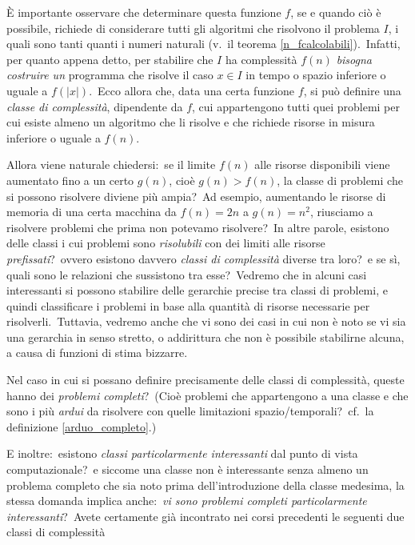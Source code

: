 È importante osservare che determinare questa funzione $f$, se e quando ciò è possibile, richiede di considerare tutti gli algoritmi che risolvono il problema $I$, i quali sono tanti quanti i numeri naturali (v.\ il teorema \ref{n_fcalcolabili}).\
Infatti, per quanto appena detto, per stabilire che $I$ ha complessità $f(n)$ \textit{bisogna costruire un} programma che risolve il caso $x \in I$ in tempo o spazio inferiore o uguale a $f(|x|)$.\
Ecco allora che, data una certa funzione $f$, si può definire una \textit{classe di complessità}, dipendente da $f$, cui appartengono tutti quei problemi per cui esiste almeno un algoritmo che li risolve e che richiede risorse in misura inferiore o uguale a $f(n)$.\

Allora viene naturale chiedersi:\ se il limite $f(n)$ alle risorse disponibili viene aumentato fino a un certo $g(n)$, cioè $g(n) > f (n)$, la classe di problemi che si possono risolvere diviene più ampia?\
Ad esempio, aumentando le risorse di memoria di una certa macchina da $f(n) = 2n$ a $g(n) = n^2$, riusciamo a risolvere problemi che prima non potevamo risolvere?\
In altre parole, esistono delle classi i cui problemi sono \textit{risolubili} con dei limiti alle risorse \textit{prefissati}?\ ovvero esistono davvero \textit{classi di complessità} diverse tra loro?\ e se sì, quali sono le relazioni che sussistono tra esse?\
Vedremo che in alcuni casi interessanti si possono stabilire delle gerarchie precise tra classi di problemi, e quindi classificare i problemi in base alla quantità di risorse necessarie per risolverli.\
Tuttavia, vedremo anche che vi sono dei casi in cui non è noto se vi sia una gerarchia in senso stretto, o addirittura che non è possibile stabilirne alcuna, a causa di funzioni di stima bizzarre.\

Nel caso in cui si possano definire precisamente delle classi di complessità, queste hanno dei \textit{problemi completi}?\
(Cioè problemi che appartengono a una classe e che sono i più \textit{ardui} da risolvere con quelle limitazioni spazio/temporali?\ cf.\ la definizione \ref{arduo_completo}.)

E inoltre:\ esistono \textit{classi particolarmente interessanti} dal punto di vista computazionale?\ e siccome una classe non è interessante senza almeno un problema completo che sia noto prima dell'introduzione della classe medesima, la stessa domanda implica anche:\ \textit{vi sono problemi completi particolarmente interessanti}?\
Avete certamente già incontrato nei corsi precedenti le seguenti due classi di complessità

